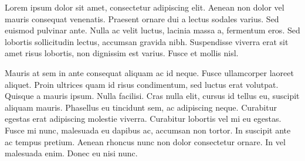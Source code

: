 Lorem ipsum dolor sit amet, consectetur adipiscing elit. Aenean non dolor vel mauris consequat venenatis. Praesent ornare dui a lectus sodales varius. Sed euismod pulvinar ante. Nulla ac velit luctus, lacinia massa a, fermentum eros. Sed lobortis sollicitudin lectus, accumsan gravida nibh. Suspendisse viverra erat sit amet risus lobortis, non dignissim est varius. Fusce et mollis nisl.

Mauris at sem in ante consequat aliquam ac id neque. Fusce ullamcorper laoreet aliquet. Proin ultrices quam id risus condimentum, sed luctus erat volutpat. Quisque a mauris ipsum. Nulla facilisi. Cras nulla elit, cursus id tellus eu, suscipit aliquam mauris. Phasellus eu tincidunt sem, ac adipiscing neque. Curabitur egestas erat adipiscing molestie viverra. Curabitur lobortis vel mi eu egestas. Fusce mi nunc, malesuada eu dapibus ac, accumsan non tortor. In suscipit ante ac tempus pretium. Aenean rhoncus nunc non dolor consectetur ornare. In vel malesuada enim. Donec eu nisi nunc.

